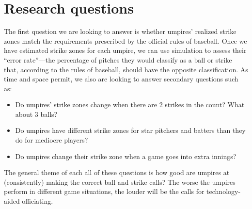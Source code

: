 \documentclass[bj, preprint]{imsart}
\begin{document}
\section{Research questions}\label{sec:research}
The first question we are looking to answer is whether umpires' realized strike zones match the requirements prescribed by the official rules of baseball. 
Once we have estimated strike zones for each umpire, we can use simulation to assess their ``error rate''---the percentage of pitches they would classify as a ball or strike that, according to the rules of baseball, should have the opposite classification.
As time and space permit, we also are looking to answer secondary questions such as:
\begin{itemize}
\item Do umpires' strike zones change when there are 2 strikes in the count? What about 3 balls?
\item Do umpires have different strike zones for star pitchers and batters than they do for mediocre players?
\item Do umpires change their strike zone when a game goes into extra innings?
\end{itemize}
The general theme of each all of these questions is how good are umpires at (consistently) making the correct ball and strike calls?
The worse the umpires perform in different game situations, the louder will be the calls for technology-aided officiating.

\end{document}

